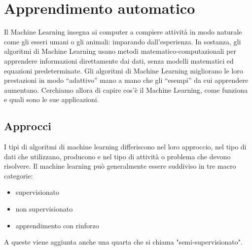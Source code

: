 \documentclass[12pt,italian]{report}
\begin{document}
\frontespizio
\beforepreface

% 
%

         
% 
%


%
%


%
%

\afterpreface

% 
% 

\chapter{Apprendimento automatico}
\label{cap:apprendimento_automatico}
Il Machine Learning insegna ai computer a compiere attività in modo naturale come gli esseri umani o gli animali: imparando dall’esperienza. In sostanza, gli algoritmi di Machine Learning usano metodi matematico-computazionali per apprendere informazioni direttamente dai dati, senza modelli matematici ed equazioni predeterminate. Gli algoritmi di Machine Learning migliorano le loro prestazioni in modo “adattivo” mano a mano che gli “esempi” da cui apprendere aumentano. Cerchiamo allora di capire cos’è il Machine Learning, come funziona e quali sono le sue applicazioni.
\section{Approcci}
\label{sec:approcci}

I tipi di algoritmi di machine learning differiscono nel loro approccio, nel tipo di dati che utilizzano, producono e nel tipo di attività o problema che devono risolvere. Il machine learning può generalmente essere suddiviso in tre macro categorie: 
\begin{itemize}
	\item supervisionato
	\item non supervisionato
	\item apprendimento con rinforzo
\end{itemize}
A queste viene aggiunta anche una quarta che si chiama "semi-supervisionato".
\end{document}
